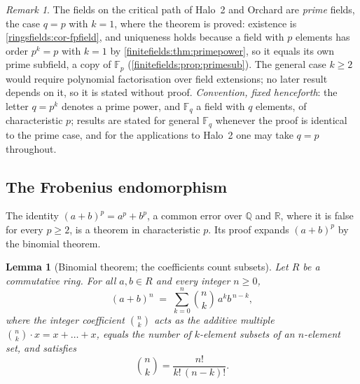 \documentclass[11pt,a4paper]{article}
\newtheorem{lemma}[theorem]{Lemma}
\theoremstyle{definition}
\theoremstyle{remark}
\newtheorem{remark}[theorem]{Remark}
\newcommand{\Q}{\ensuremath{\mathbb{Q}}}
\newcommand{\R}{\ensuremath{\mathbb{R}}}
\newcommand{\Fp}{\ensuremath{\mathbb{F}_{p}}}
\newcommand{\Fq}{\ensuremath{\mathbb{F}_{q}}}
\begin{document}
\begin{remark}\label{finitefields:rem:whyunproved}
The fields on the critical path of Halo~2 and Orchard are \emph{prime}
fields, the case \(q = p\) with \(k = 1\), where the theorem is proved:
existence is \cref{ringsfields:cor-fpfield}, and uniqueness holds because a
field with \(p\) elements has order \(p^k = p\) with \(k = 1\) by
\cref{finitefields:thm:primepower}, so it equals its own prime subfield, a
copy of \(\Fp\) (\cref{finitefields:prop:primesub}). The general case
\(k \ge 2\) would require polynomial factorisation over field extensions; no
later result depends on it, so it is stated without proof.
\emph{Convention, fixed henceforth}: the letter \(q = p^k\) denotes a
prime power, and \(\Fq\) a field with \(q\) elements, of characteristic
\(p\); results are stated for general \(\Fq\) whenever the proof is
identical to the prime case, and for the applications to Halo~2 one may
take \(q = p\) throughout.
\end{remark}

\subsection{The Frobenius endomorphism}\label{finitefields:sub:frobenius}

The identity \((a+b)^p = a^p + b^p\), a common error over \(\Q\) and \(\R\),
where it is false for every \(p \ge 2\), is a theorem in characteristic
\(p\). Its proof expands \((a+b)^p\) by the binomial theorem.

\begin{lemma}[Binomial theorem; the coefficients count subsets]
\label{finitefields:lem:binomcount}
Let \(R\) be a commutative ring. For all \(a, b \in R\) and every
integer \(n \ge 0\),
\[
(a+b)^n \;=\; \sum_{k=0}^{n} \binom{n}{k}\, a^k b^{\,n-k} ,
\]
where the integer coefficient \(\binom{n}{k}\) acts as the additive
multiple \(\binom{n}{k} \cdot x = x + \dots + x\), equals the number of
\(k\)-element subsets of an \(n\)-element set, and satisfies
\[
\binom{n}{k} = \frac{n!}{k!\,(n-k)!} .
\]
\end{lemma}
\end{document}
